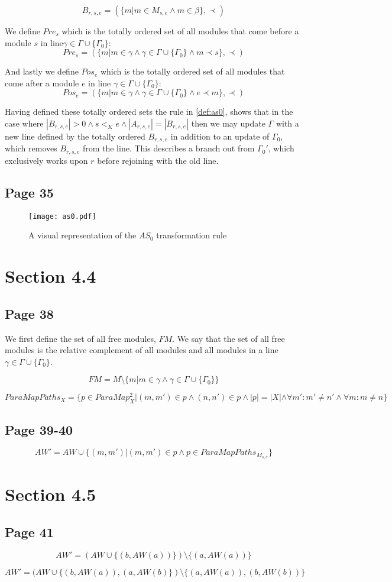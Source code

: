 \[B_{r,s,e} = (\{m |m \in M_{s,e} \land m \in \beta\}, \prec)\]

We define $Pre_{s}$ which is the totally ordered set of all modules that come before a module $s$ in line$\gamma \in \Gamma \cup \{\Gamma_0\} $:
\[Pre_{s} = (\{m | m \in \gamma \land \gamma \in \Gamma \cup \{\Gamma_0\} \land m \prec s\}, \prec)\]

And lastly we define $Pos_{e}$ which is the totally ordered set of all modules that come after a module $e$  in line $\gamma \in \Gamma \cup \{\Gamma_0\} $:
\[Pos_{e} = (\{m | m \in \gamma \land \gamma \in \Gamma \cup \{\Gamma_0\} \land e \prec  m \}, \prec)\]

Having defined these totally ordered sets the rule in \cref{def:as0}, shows that in the case where $|B_{r,s,e}| > 0 \land s <_K e \land |A_{r,s,e}| = |B_{r,s,e}|$ then we may update $\Gamma$ with a new line defined by the totally  ordered $B_{r,s,e}$ in addition to an update of $\Gamma_0$, which removes $B_{r,s,e}$ from the line. This describes a branch out from $\Gamma_0'$, which exclusively works upon $r$ before rejoining with the old line. 

\subsection*{Page 35}
\begin{figure}[H]
\centering
\texttt{[image: as0.pdf]}
\caption{A visual representation of the $AS_0$ transformation rule}
\label{fig:as0}
\end{figure}

\section*{Section 4.4}
\subsection*{Page 38}
We first define the set of all free modules, $FM$. We say that the set of all free modules is the relative complement of all modules and all modules in a line $\gamma \in \Gamma \cup \{\Gamma_0\}$.

\[FM = M \setminus \{m | m \in \gamma \land \gamma \in \Gamma \cup \{\Gamma_0\}\}\]


\[ParaMapPaths_{X} = \{p \in ParaMap_{X}^2 | (m,m') \in p \land (n,n') \in p \land |p| = |X| \land  \forall m': m' \neq n' \land  \forall m: m \neq n \}\]

\subsection*{Page 39-40}

\[AW' = AW \cup \{(m, m') | (m, m') \in p \land p \in ParaMapPaths_{M_{s,e}}\}\]

\section*{Section 4.5}
\subsection*{Page 41}
\[AW' = (AW \cup \{(b, AW(a))\}) \setminus \{(a, AW(a))\}\]

\[AW' = (AW \cup \{(b, AW(a)), (a, AW(b)\}) \setminus \{(a, AW(a)), (b, AW(b))\}\]

